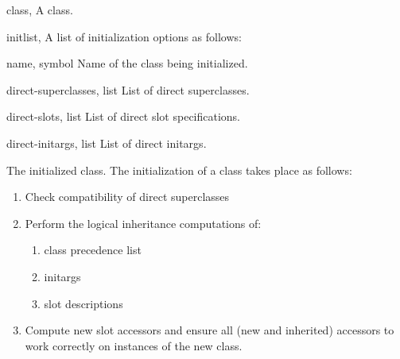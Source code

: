 %
\begin{optDefinition}
%
\begin{specargs}
    \item[class, \classref{class}] A class.
    \item[initlist, \classref{list}] A list of initialization options as
    follows:

    \begin{options}
        \item[name, symbol] Name of the class being initialized.
        \item[direct-superclasses, list] List of direct superclasses.
        \item[direct-slots, list] List of direct slot specifications.
        \item[direct-initargs, list] List of direct initargs.
    \end{options}
\end{specargs}
%
\result%
The initialized class.
%
\remarks%
The initialization of a class takes place as follows:
%
\begin{enumerate}
    \item Check compatibility of direct superclasses

    \item Perform the logical inheritance computations of:
    \begin{enumerate}
        \item class precedence list
        \item initargs
        \item slot descriptions
    \end{enumerate}

    \item Compute new slot accessors and ensure all (new and inherited)
    accessors to work correctly on instances of the new class.



\end{enumerate}
\end{optDefinition}
